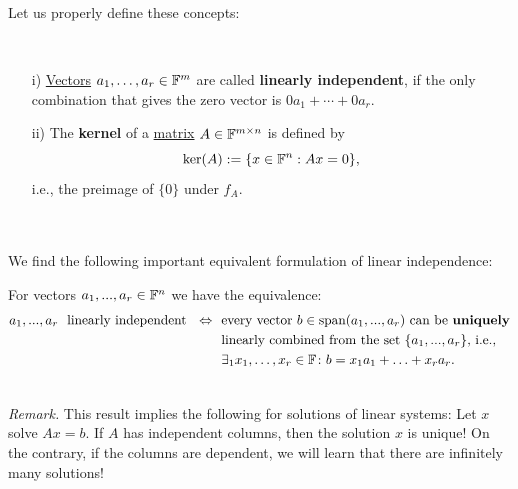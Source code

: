 \begin{frame}
Let us properly define these concepts:
\begin{definition}\label{def:linIndep_Kernel}~\\
	\begin{itemize}
		\item[i)] \underline{Vectors} $a_1, \ldots, a_r \in {\mathbb{F}}^m$	are called \textbf{linearly independent}, if the only combination that gives the zero vector is $0a_1 + \cdots+0 a_r$.\\
		\item[ii)] The \textbf{kernel} of a \underline{matrix} $A \in {\mathbb{F}}^{m\times n}$ is defined by $$\ker(A) := \{x\in{\mathbb{F}}^{n}: Ax = 0\},$$
		i.e., the preimage of $\{0\}$ under $f_A$. 	
	\end{itemize}
\end{definition}
~\\~\\
 We find the following important equivalent formulation of linear independence:\\
  \begin{lemma} \label{lem:linear-independence}
 	For vectors $a_1,...,a_r \in {\mathbb{F}}^{n}$ we have the equivalence:
 	\begin{align*}
 	a_1,...,a_r~~ \text{linearly independent}
 	~~\Leftrightarrow~~
 	&\text{every vector $b \in \text{span} (a_1,...,a_r)$ can be \textbf{uniquely}}\\
 	&\text{linearly combined from the set $\{a_1,...,a_r\}$, i.e.,}\\
 	&\exists_1 x_1,\ldots,x_r \in {\mathbb{F}}\colon b = x_1a_1 + \ldots +x_ra_r.
 	\end{align*}
 \end{lemma}
 ~\\
\textit{Remark.} This result implies the following for solutions of linear systems: Let $x$ solve $Ax=b$. If $A$ has independent columns, then the solution $x$ is unique! On the contrary, if the columns are dependent, we will learn that there are infinitely many solutions!
\end{frame}

